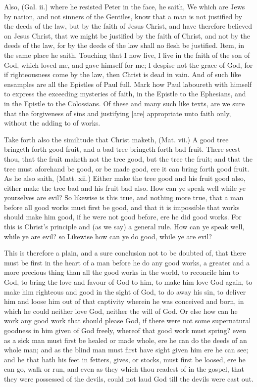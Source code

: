 Also, (Gal. ii.) where he resisted Peter in the face, he 
saith, We which are Jews by nation, and not sinners of the 
Gentiles, know that a man is not justified by the deeds of 
the law, but by the faith of Jesus Christ, and have therefore 
believed on Jesus Christ, that we might be justified by the 
faith of Christ, and not by the deeds of the law, for by the 
deeds of the law shall no flesh be justified. Item, in the 
same place he saith, Touching that I now live, I live in the 
faith of the son of God, which loved me, and gave himself 
for me; I despise not the grace of God, for if
righteousness come by the law, then Christ is dead in vain. And 
of such like ensamples are all the Epistles of Paul full.
Mark how Paul laboureth with himself to express the
exceeding mysteries of faith, in the Epistle to the Ephesians, 
and in the Epistle to the Colossians. Of these and many 
such like texts, are we sure that the forgiveness of sins 
and justifying [are] appropriate unto faith only, without the 
adding to of works. 

Take forth also the similitude that Christ maketh, (Mat. 
vii.) A good tree bringeth forth good fruit, and a bad tree 
bringeth forth bad fruit. There seest thou, that the fruit 
maketh not the tree good, but the tree the fruit; and that 
the tree must aforehand be good, or be made good, ere it 
can bring forth good fruit. As he also saith, (Matt. xii.) 
Either make the tree good and his fruit good also, either 
make the tree bad and his fruit bad also. How can ye 
speak well while ye yourselves are evil? So likewise is this 
true, and nothing more true, that a man before all good 
works must first be good, and that it is impossible that 
works should make him good, if he were not good before, 
ere he did good works. For this is Christ's principle and 
(as we say) a general rule. How can ye speak well, 
while ye are evil? so Likewise how can ye do good, while 
ye are evil? 

This is therefore a plain, and a sure conclusion not to 
be doubted of, that there must be first in the heart of a 
man before he do any good works, a greater and a more 
precious thing than all the good works in the world, to
reconcile him to God, to bring the love and favour of God to 
him, to make him love God again, to make him righteous 
and good in the sight of God, to do away his sin, to
deliver him and loose him out of that captivity wherein he 
was conceived and born, in which he could neither love 
God, neither the will of God. Or else how can he work 
any good work that should please God, if there were not 
some supernatural goodness in him given of God freely, 
whereof that good work must spring? even as a sick man 
must first be healed or made whole, ere he can do the deeds 
of an whole man; and as the blind man must first have sight 
given him ere he can see; and he that hath his feet in 
fetters, gives, or stocks, must first be loosed, ere he can go, 
walk or run, and even as they which thou readest of in 
the gospel, that they were possessed of the devils, could 
not laud God till the devils were cast out. 

